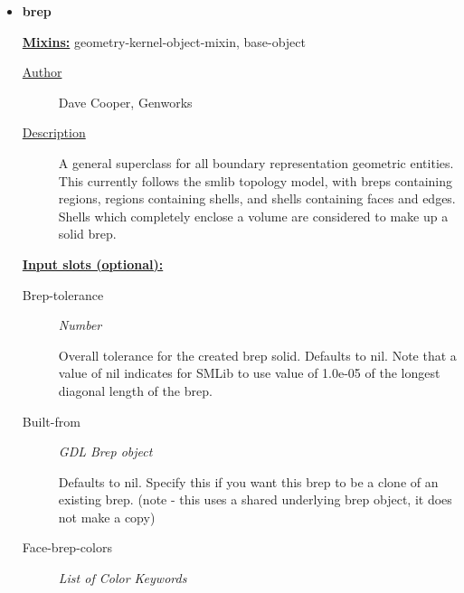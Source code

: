 \documentclass [11pt]{book}
\begin{document}
\begin{itemize}
\begin{description}
\end{description}







\item {}
\label{prim:brep}
\textbf{brep}


\textbf{
\underline{Mixins:}} geometry-kernel-object-mixin, base-object





\begin{description}

\item [
\underline{Author}]


Dave Cooper, Genworks



\item [
\underline{Description}]


A general superclass for all boundary representation geometric entities. 
This currently follows the smlib topology model, with breps containing regions, regions containing shells, 
and shells containing faces and edges. Shells which completely enclose a volume are considered 
to make up a solid brep.



\end{description}








\textbf{
\underline{Input slots (optional):}}

\begin{description}

\item [Brep-tolerance]
\emph{Number}

 Overall tolerance for the created brep solid. Defaults to nil.
Note that a value of nil indicates for SMLib to use value of 1.0e-05 of the
longest diagonal length of the brep.




\item [Built-from]
\emph{GDL Brep object}

 Defaults to nil.
Specify this if you want this brep to be a clone of an existing brep. (note -
this uses a shared underlying brep object, it does not make a copy)




\item [Face-brep-colors]
\emph{List of Color Keywords}


\end{description}
\end{itemize}
\end{document}
